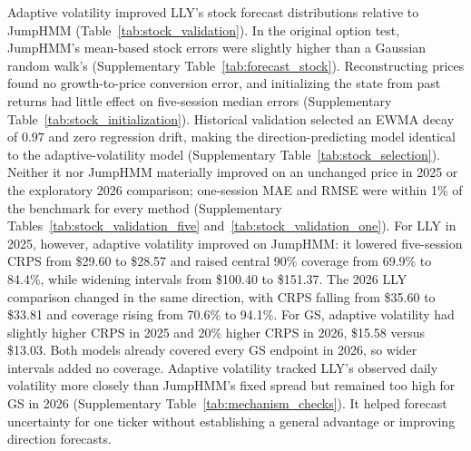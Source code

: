 Adaptive volatility improved LLY's stock forecast distributions relative to JumpHMM (Table~\ref{tab:stock_validation}). In the original option test, JumpHMM's mean-based stock errors were slightly higher than a Gaussian random walk's (Supplementary Table~\ref{tab:forecast_stock}). Reconstructing prices found no growth-to-price conversion error, and initializing the state from past returns had little effect on five-session median errors (Supplementary Table~\ref{tab:stock_initialization}). Historical validation selected an EWMA decay of $0.97$ and zero regression drift, making the direction-predicting model identical to the adaptive-volatility model (Supplementary Table~\ref{tab:stock_selection}). Neither it nor JumpHMM materially improved on an unchanged price in 2025 or the exploratory 2026 comparison; one-session MAE and RMSE were within 1\% of the benchmark for every method (Supplementary Tables~\ref{tab:stock_validation_five} and~\ref{tab:stock_validation_one}). For LLY in 2025, however, adaptive volatility improved on JumpHMM: it lowered five-session CRPS from \$29.60 to \$28.57 and raised central 90\% coverage from 69.9\% to 84.4\%, while widening intervals from \$100.40 to \$151.37. The 2026 LLY comparison changed in the same direction, with CRPS falling from \$35.60 to \$33.81 and coverage rising from 70.6\% to 94.1\%. For GS, adaptive volatility had slightly higher CRPS in 2025 and 20\% higher CRPS in 2026, \$15.58 versus \$13.03. Both models already covered every GS endpoint in 2026, so wider intervals added no coverage. Adaptive volatility tracked LLY's observed daily volatility more closely than JumpHMM's fixed spread but remained too high for GS in 2026 (Supplementary Table~\ref{tab:mechanism_checks}). It helped forecast uncertainty for one ticker without establishing a general advantage or improving direction forecasts.

\begin{table}[H]
\centering
\caption{Five-session stock forecasts in 2025 and August--September 2026. Each ticker has 245 origins in 2025 and 17 in 2026. Unlike Table~\ref{tab:forecast_main}, this table's MAE scores the forecast median. Monetary quantities (MAE, CRPS, and central 90\% interval width) are in dollars per share. Scores average dates within each of three 10{,}000-path simulation seeds and then average the seeds. Adaptive volatility denotes the Gaussian model with EWMA decay $0.97$ selected on historical data. Historical selection set the direction-predicting model's drift to zero, which made it identical to the adaptive-volatility model, so the table omits it. The unchanged-price benchmark has no uncertainty interval. The last column counts origins on which the adaptive-volatility model had lower date-level CRPS than JumpHMM.}\label{tab:stock_validation}
\resizebox{\textwidth}{!}{}
\end{table}

